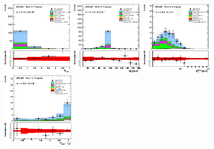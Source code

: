 \begin{figure}[ht!]
\centering
\includegraphics[width=0.32\textwidth]{figures/appendix_signal_selection/Nov24Update_FakeSys_KFacSys_LinearY_Rebin/output/jobs/MxM/DataFull_Rates_May13_FakeRatesExactly2Loose_MuonMxMBJetGt0_ElBJetGt0SubtractPC_MxM/PreselectionNov23_15_1SFOS_ChargeAbs1_physics/weight_all/eps/NBTaggedJets_histratio.eps}
\includegraphics[width=0.32\textwidth]{figures/appendix_signal_selection/Nov24Update_FakeSys_KFacSys_LinearY_Rebin/output/jobs/MxM/DataFull_Rates_May13_FakeRatesExactly2Loose_MuonMxMBJetGt0_ElBJetGt0SubtractPC_MxM/PreselectionNov23_15_1SFOS_ChargeAbs1_BVeto85_physics/weight_all/eps/InvariantMassSFOS_histratio.eps}
\includegraphics[width=0.32\textwidth]{figures/appendix_signal_selection/Nov24Update_FakeSys_KFacSys_LinearY_Rebin/output/jobs/MxM/DataFull_Rates_May13_FakeRatesExactly2Loose_MuonMxMBJetGt0_ElBJetGt0SubtractPC_MxM/PreselectionNov23_15_1SFOS_ChargeAbs1_BVeto85_ZVetoLow35High25GeV_physics/weight_all/eps/MET_Et_histratio.eps}
\includegraphics[width=0.32\textwidth]{figures/appendix_signal_selection/Nov24Update_FakeSys_KFacSys_LinearY_Rebin/output/jobs/MxM/DataFull_Rates_May13_FakeRatesExactly2Loose_MuonMxMBJetGt0_ElBJetGt0SubtractPC_MxM/PreselectionNov23_15_1SFOS_ChargeAbs1_BVeto85_ZVetoLow35High25GeV_METGt45GeV_physics/weight_all/eps/DeltaPhiMET123_Abs_histratio.eps}

\end{figure}

